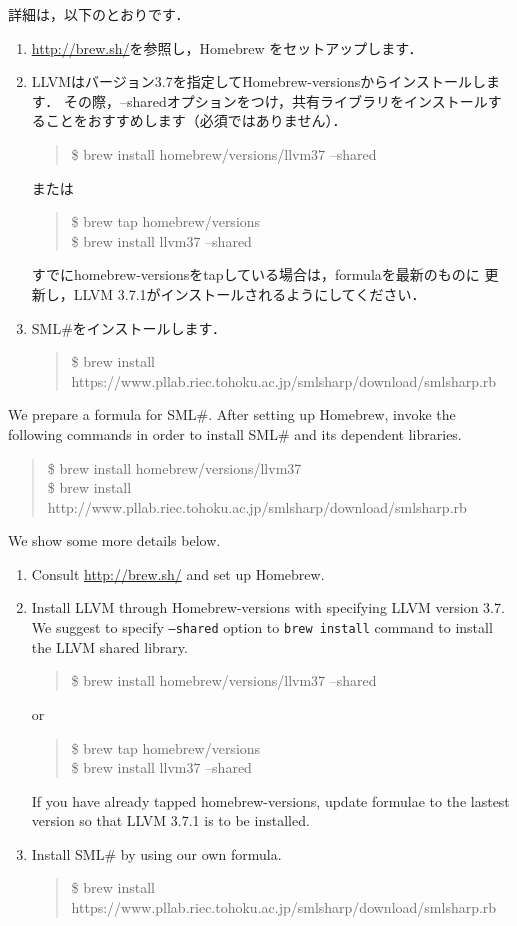 \documentclass{jbook}
\newcommand{\smlsharp}{SML\#}
\newenvironment{program}{\begin{quote}\begin{tt}}%
                        {\end{tt}\end{quote}}
\begin{document}
	詳細は，以下のとおりです．
\begin{enumerate}
\item 
	\url{http://brew.sh/}を参照し，Homebrew をセットアップします．

\item
	LLVMはバージョン3.7を指定してHomebrew-versionsからインストールします．
	その際，--sharedオプションをつけ，共有ライブラリをインストールすることをおすすめします（必須ではありません）．
\begin{program}
\$ brew install homebrew/versions/llvm37 --shared
\end{program}
	または
\begin{program}
\$ brew tap homebrew/versions\\
\$ brew install llvm37 --shared
\end{program}
	すでにhomebrew-versionsをtapしている場合は，formulaを最新のものに
更新し，LLVM 3.7.1がインストールされるようにしてください．

\item
	\smlsharp{}をインストールします．
\begin{program}
\$ brew install https://www.pllab.riec.tohoku.ac.jp/smlsharp/download/smlsharp.rb
\end{program}
\end{enumerate}

\else%

	We prepare a formula for \smlsharp{}.
	After setting up Homebrew, invoke the following commands in order to
install \smlsharp{} and its dependent libraries.
\begin{program}
\$ brew install homebrew/versions/llvm37\\
\$ brew install http://www.pllab.riec.tohoku.ac.jp/smlsharp/download/smlsharp.rb
\end{program}

	We show some more details below.
\begin{enumerate}
\item 
	Consult \url{http://brew.sh/} and set up Homebrew.

\item
	Install LLVM through Homebrew-versions with specifying LLVM version 3.7.
	We suggest to specify {\tt --shared} option to {\tt brew install} command
to install the LLVM shared library.
\begin{program}
\$ brew install homebrew/versions/llvm37 --shared
\end{program}
or
\begin{program}
\$ brew tap homebrew/versions\\
\$ brew install llvm37 --shared
\end{program}
	If you have already tapped homebrew-versions, update formulae to the
lastest version so that LLVM 3.7.1 is to be installed.

\item
	Install \smlsharp{} by using our own formula.
\begin{program}
\$ brew install https://www.pllab.riec.tohoku.ac.jp/smlsharp/download/smlsharp.rb
\end{program}
\end{enumerate}
\end{document}
